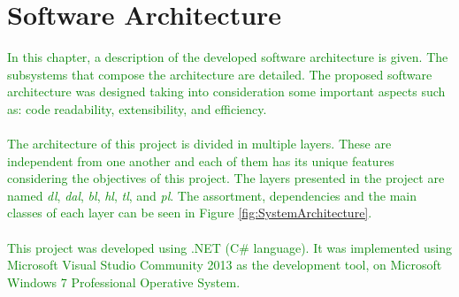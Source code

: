 \chapter{Software Architecture}
\label{chap:Architecture}
\thispagestyle{plain}

\textcolor{green}{In this chapter, a description of the developed software architecture is given. The subsystems that compose the architecture are detailed. The proposed software architecture was designed taking into consideration some important aspects such as: code readability, extensibility, and efficiency.\\
\\
The architecture of this project is divided in multiple layers. These are independent from one another and each of them has its unique features considering the objectives of this project. The layers presented in the project are named \textit{\gls{dl}}, \textit{\gls{dal}}, \textit{\gls{bl}}, \textit{\gls{hl}}, \textit{\gls{tl}}, and \textit{\gls{pl}}. The assortment, dependencies and the main classes of each layer can be seen in Figure \ref{fig:SystemArchitecture}.\\
\\
This project was developed using .NET (C\# language). It was implemented using Microsoft Visual Studio Community 2013 as the development tool, on Microsoft Windows 7 Professional Operative System.
}
